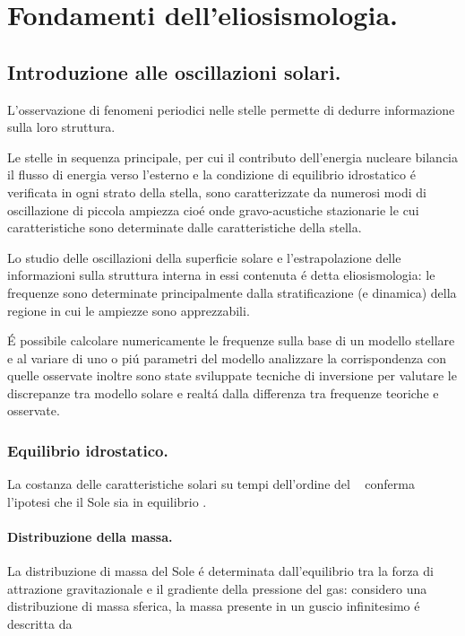 \documentclass[oneside,12pt]{memoir}
\begin{document}
\mainmatter

\part{Fondamenti dell'eliosismologia.}

\chapter{Introduzione alle oscillazioni solari.}

L'osservazione di fenomeni periodici nelle stelle permette di dedurre informazione sulla loro struttura.

Le stelle in sequenza principale, per cui il contributo dell'energia nucleare bilancia il flusso di energia verso l'esterno e la condizione di equilibrio idrostatico \'e verificata in ogni strato della stella, sono caratterizzate da numerosi modi di oscillazione di piccola ampiezza cio\'e onde gravo-acustiche stazionarie le cui caratteristiche sono determinate dalle caratteristiche della stella.

Lo studio delle oscillazioni della superficie solare e l'estrapolazione delle informazioni sulla struttura interna in essi contenuta \'e detta eliosismologia: le frequenze sono determinate principalmente dalla stratificazione (e dinamica) della regione in cui le ampiezze sono apprezzabili.

\'E possibile calcolare numericamente le frequenze sulla base di un modello stellare e al variare di uno o pi\'u parametri del modello analizzare la corrispondenza con quelle osservate inoltre sono state sviluppate tecniche di inversione per valutare le discrepanze tra modello solare e realt\'a dalla differenza tra frequenze teoriche e osservate.


\section{Equilibrio idrostatico.}

La costanza delle caratteristiche solari su tempi dell'ordine del \si{\mega\year} conferma l'ipotesi che il Sole sia in equilibrio .

\subsection{Distribuzione della massa.}

La distribuzione di massa del Sole \'e determinata dall'equilibrio tra la forza di attrazione gravitazionale e il gradiente della pressione del gas: considero una distribuzione di massa sferica, la massa presente in un guscio infinitesimo \'e descritta da
\end{document}
